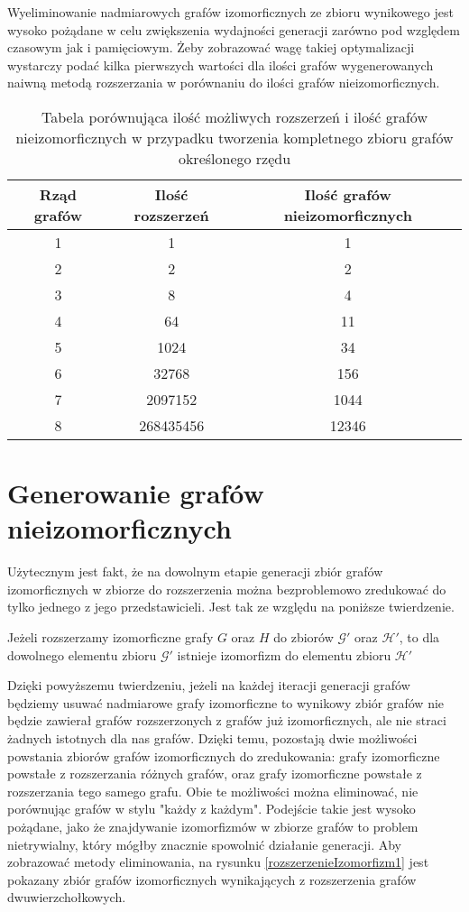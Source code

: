  Wyeliminowanie nadmiarowych grafów izomorficznych ze zbioru wynikowego jest wysoko pożądane w celu zwiększenia wydajności generacji zarówno pod względem czasowym jak i pamięciowym. Żeby zobrazować wagę takiej optymalizacji wystarczy podać kilka pierwszych wartości dla ilości grafów wygenerowanych naiwną metodą rozszerzania w porównaniu do ilości grafów nieizomorficznych.
 \begin{table}[H]
 \begin{center}
 \begin{tabular}{|c c c|} 
 \hline
 Rząd grafów & Ilość rozszerzeń\cite{OEIS2} & Ilość grafów nieizomorficznych\cite{OEIS}  \\ 
 \hline\hline
 1 & 1 & 1  \\ 
 \hline
 2 & 2 & 2  \\
 \hline
 3 & 8 & 4  \\
 \hline
 4 & 64 & 11  \\
 \hline
 5 & 1024 & 34  \\
 \hline
 6 & 32768 & 156  \\
 \hline
 7 & 2097152 & 1044  \\
 \hline
 8 & 268435456 & 12346  \\
 \hline
\end{tabular}
\end{center}
 \caption{Tabela porównująca ilość możliwych rozszerzeń i ilość grafów nieizomorficznych w przypadku tworzenia kompletnego zbioru grafów określonego rzędu}
 \end{table}

\section{Generowanie grafów nieizomorficznych}
Użytecznym jest fakt, że na dowolnym etapie generacji zbiór grafów izomorficznych w zbiorze do rozszerzenia można bezproblemowo zredukować do tylko jednego z jego przedstawicieli. Jest tak ze względu na poniższe twierdzenie.
\begin{theorem}
Jeżeli rozszerzamy izomorficzne grafy $G$ oraz $H$ do zbiorów $\mathcal{G'}$ oraz $\mathcal{H'}$, to dla dowolnego elementu zbioru $\mathcal{G'}$ istnieje izomorfizm do elementu zbioru $\mathcal{H'}$
\end{theorem}


Dzięki powyższemu twierdzeniu, jeżeli na każdej iteracji generacji grafów będziemy usuwać nadmiarowe grafy izomorficzne to wynikowy zbiór grafów nie będzie zawierał  grafów rozszerzonych z grafów już izomorficznych, ale nie straci żadnych istotnych dla nas grafów. Dzięki temu, pozostają dwie możliwości powstania zbiorów grafów izomorficznych do zredukowania: grafy izomorficzne powstałe z rozszerzania różnych grafów, oraz grafy izomorficzne powstałe z rozszerzania tego samego grafu. Obie te możliwości można eliminować, nie porównując grafów w stylu "każdy z każdym". Podejście takie jest wysoko pożądane, jako że znajdywanie izomorfizmów w zbiorze grafów to problem nietrywialny, który mógłby znacznie spowolnić działanie generacji. Aby zobrazować metody eliminowania, na rysunku \ref{rozszerzenieIzomorfizm1} jest pokazany zbiór grafów izomorficznych wynikających z rozszerzenia grafów dwuwierzchołkowych. 


